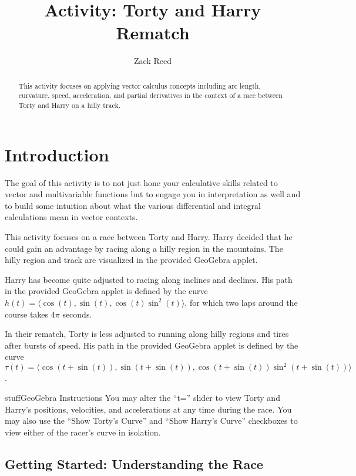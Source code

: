 \documentclass{ximera}
\title{Activity: Torty and Harry Rematch}
\author{Zack Reed}
\begin{document}
\begin{abstract}
This activity focuses on applying vector calculus concepts including arc length, curvature, speed, acceleration, and partial derivatives in the context of a race between Torty and Harry on a hilly track.
\end{abstract}
\maketitle

\section*{Introduction}

The goal of this activity is to not just hone your calculative skills related to vector and multivariable functions but to engage you in interpretation as well and to build some intuition about what the various differential and integral calculations mean in vector contexts.

This activity focuses on a race between Torty and Harry. Harry decided that he could gain an advantage by racing along a hilly region in the mountains. The hilly region and track are visualized in the provided GeoGebra applet.

Harry has become quite adjusted to racing along inclines and declines. His path in the provided GeoGebra applet is defined by the curve $h(t)=\langle \cos(t), \sin(t), \cos(t)\sin^2(t)\rangle$, for which two laps around the course takes $4 \pi$ seconds.

In their rematch, Torty is less adjusted to running along hilly regions and tires after bursts of speed. His path in the provided GeoGebra applet is defined by the curve $\tau (t)=\langle \cos(t+\sin(t)), \sin(t+\sin(t)), \cos(t+\sin(t))\sin^2(t+\sin(t))\rangle$.

\begin{expandable}{stuff}{GeoGebra Instructions}
    You may alter the ``t='' slider to view Torty and Harry's positions, velocities, and accelerations at any time during the race. You may also use the ``Show Torty's Curve'' and ``Show Harry's Curve'' checkboxes to view either of the racer's curve in isolation.
\end{expandable}

\begin{center}
\end{center}

\subsection*{Getting Started: Understanding the Race}
\end{document}
